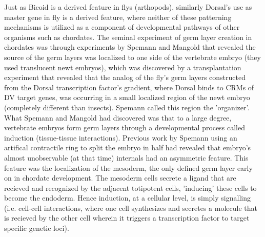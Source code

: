 
Just as Bicoid is a derived feature in flys (arthopods), similarly Dorsal's use as master gene in fly is a derived feature, where neither of these patterning mechanisms is utilized as a component of developmental pathways of other organisms such as chordates.  The seminal experiment of germ layer creation in chordates was through experiments by Spemann and Mangold that revealed the source of the germ layers was localized to one side of the vertebrate embryo (they used translucent newt embryos), which was discovered by a transplantation experiment that revealed that the analog of the fly's germ layers constructed from the Dorsal transcription factor's gradient, where Dorsal binds to CRMs of DV target genes, was occurring in a small localized region of the newt embryo (completely different than insects).  Spemann called this region the 'organizer'.  What Spemann and Mangold had discovered was that to a large degree, vertebrate embryos form germ layers through a developmental process called induction (tissue-tissue interactions).  Previous work by Spemann using an artifical contractile ring to split the embryo in half had revealed that embryo's almost unobservable (at that time) internals had an asymmetric feature.  This feature was the localization of the mesoderm, the only defined germ layer early on in chordate development.  The mesoderm cells secrete a ligand that are recieved and recognized by the adjacent totipotent cells, 'inducing' these cells to become the endoderm.  Hence induction, at a cellular level, is simply signalling (i.e. cell-cell interactions, where one cell synthesizes and secretes a molecule that is recieved by the other cell wherein it triggers a transcription factor to target specific genetic loci).

